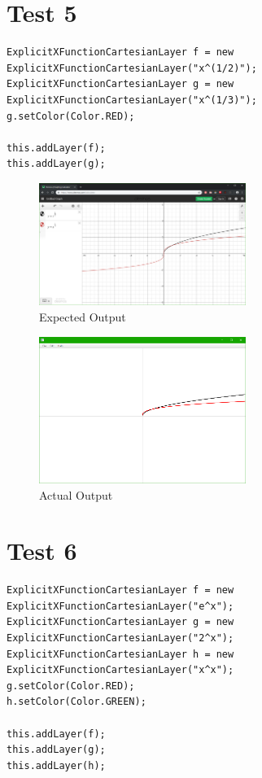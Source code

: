 \documentclass[../../../main.tex]{subfiles}
\begin{document}
\section{Test 5}
\begin{verbatim}
ExplicitXFunctionCartesianLayer f = new ExplicitXFunctionCartesianLayer("x^(1/2)");
ExplicitXFunctionCartesianLayer g = new ExplicitXFunctionCartesianLayer("x^(1/3)");
g.setColor(Color.RED);

this.addLayer(f);
this.addLayer(g);
\end{verbatim}

\begin{figure}[H]
	\centering
	\includegraphics[width=0.6\textwidth]{tests/expected5}
	\caption{Expected Output}
\end{figure}

\begin{figure}[H]
	\centering
	\includegraphics[width=0.6\textwidth]{tests/actual5}
	\caption{Actual Output}
\end{figure}
\newpage

\section{Test 6}
\begin{verbatim}
ExplicitXFunctionCartesianLayer f = new ExplicitXFunctionCartesianLayer("e^x");
ExplicitXFunctionCartesianLayer g = new ExplicitXFunctionCartesianLayer("2^x");
ExplicitXFunctionCartesianLayer h = new ExplicitXFunctionCartesianLayer("x^x");
g.setColor(Color.RED);
h.setColor(Color.GREEN);

this.addLayer(f);
this.addLayer(g);
this.addLayer(h);
\end{verbatim}
\end{document}
